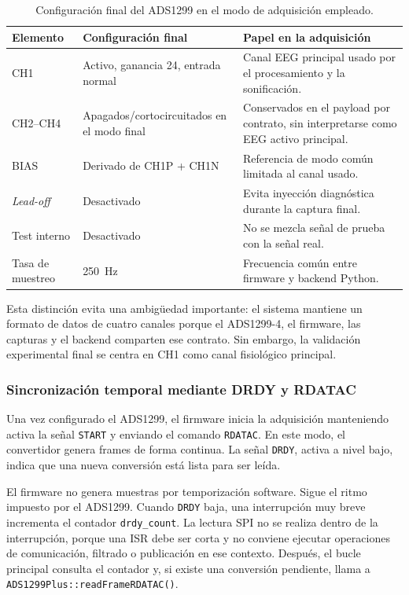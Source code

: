 \begin{table}[H]
    \centering
    \caption{Configuración final del ADS1299 en el modo de adquisición empleado.}
    \label{tab:impl_ads1299_modo_final}
    \begin{tabular}{p{}p{}p{}}
        \hline
        \textbf{Elemento} & \textbf{Configuración final} & \textbf{Papel en la adquisición} \\
        \hline
        CH1 & Activo, ganancia 24, entrada normal & Canal EEG principal usado por el procesamiento y la sonificación. \\
        CH2--CH4 & Apagados/cortocircuitados en el modo final & Conservados en el payload por contrato, sin interpretarse como EEG activo principal. \\
        BIAS & Derivado de CH1P + CH1N & Referencia de modo común limitada al canal usado. \\
        \textit{Lead-off} & Desactivado & Evita inyección diagnóstica durante la captura final. \\
        Test interno & Desactivado & No se mezcla señal de prueba con la señal real. \\
        Tasa de muestreo & \SI{250}{\hertz} & Frecuencia común entre firmware y backend Python. \\
        \hline
    \end{tabular}
\end{table}

Esta distinción evita una ambigüedad importante: el sistema mantiene un formato de datos de cuatro canales porque el ADS1299-4, el firmware, las capturas y el backend comparten ese contrato. Sin embargo, la validación experimental final se centra en CH1 como canal fisiológico principal.

\subsubsection{Sincronización temporal mediante DRDY y RDATAC}

Una vez configurado el ADS1299, el firmware inicia la adquisición manteniendo activa la señal \texttt{START} y enviando el comando \texttt{RDATAC}. En este modo, el convertidor genera frames de forma continua. La señal \texttt{DRDY}, activa a nivel bajo, indica que una nueva conversión está lista para ser leída.

El firmware no genera muestras por temporización software. Sigue el ritmo impuesto por el ADS1299. Cuando \texttt{DRDY} baja, una interrupción muy breve incrementa el contador \texttt{drdy\_count}. La lectura SPI no se realiza dentro de la interrupción, porque una ISR debe ser corta y no conviene ejecutar operaciones de comunicación, filtrado o publicación en ese contexto. Después, el bucle principal consulta el contador y, si existe una conversión pendiente, llama a \texttt{ADS1299Plus::readFrameRDATAC()}.

